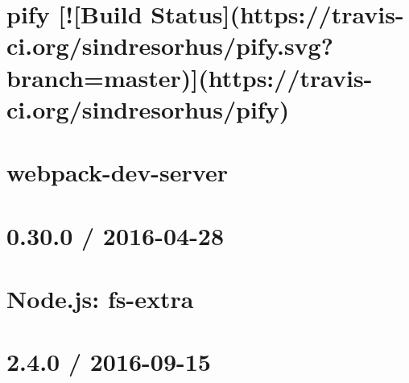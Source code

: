 \documentclass[twoside]{book}
\newcommand{\+}{\discretionary{\mbox{\scriptsize$\hookleftarrow$}}{}{}}
\begin{document}
\chapter{pify \mbox{[}!\mbox{[}Build Status\mbox{]}(https\+://travis-\/ci.org/sindresorhus/pify.svg?branch=master)\mbox{]}(https\+://travis-\/ci.org/sindresorhus/pify)}
\label{md__c_1_workspace_demo_src_main_script_node_modules_webpack-dev-server_node_modules_pify_readme}

\chapter{webpack-\/dev-\/server}
\label{md__c_1_workspace_demo_src_main_script_node_modules_webpack-dev-server__r_e_a_d_m_e}

\chapter{0.30.0 / 2016-\/04-\/28}
\label{md__c_1_workspace_demo_src_main_script_node_modules_webpack-manifest-plugin_node_modules_fs-extra__c_h_a_n_g_e_l_o_g}

\chapter{Node.\+js\+: fs-\/extra}
\label{md__c_1_workspace_demo_src_main_script_node_modules_webpack-manifest-plugin_node_modules_fs-extra__r_e_a_d_m_e}

\chapter{2.4.0 / 2016-\/09-\/15}
\label{md__c_1_workspace_demo_src_main_script_node_modules_webpack-manifest-plugin_node_modules_jsonfile__c_h_a_n_g_e_l_o_g}

\end{document}
